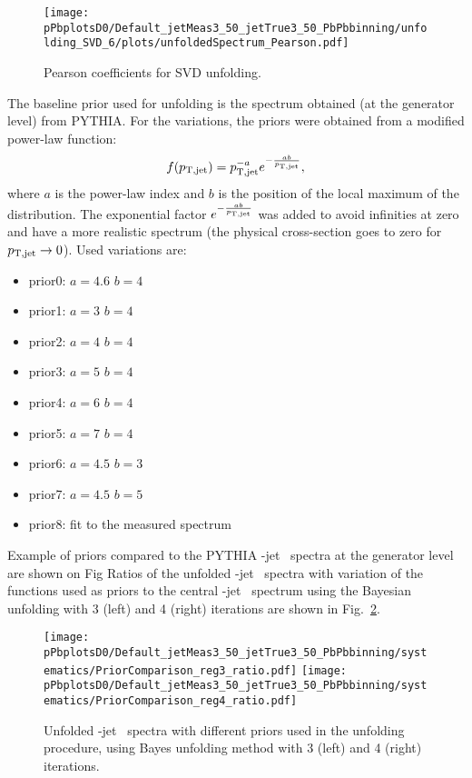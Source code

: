 \begin{figure}[bth]
\centering
\texttt{[image: pPbplotsD0/Default\_jetMeas3\_50\_jetTrue3\_50\_PbPbbinning/unfolding\_SVD\_6/plots/unfoldedSpectrum\_Pearson.pdf]}
\caption{Pearson coefficients for SVD unfolding.}
\label{fig:PbPb_unfPearson_pPb_Dzero_SVD}
\end{figure}


The baseline prior used for unfolding is the spectrum obtained (at the generator level) from PYTHIA.
For the variations, the priors were obtained from a modified power-law function:
\begin{equation}
f(p_{\mathrm{T,jet}}) = p_{\mathrm{T,jet}}^{-a}e^{-\frac{ab}{p_{\mathrm{T,jet}}}},
\end{equation}
where $a$ is the power-law index and $b$ is the position of the local maximum of the distribution. The exponential factor $e^{-\frac{ab}{p_{\mathrm{T,jet}}}}$ was added to avoid infinities at zero and have a more realistic spectrum (the physical cross-section goes to zero for $p_{\mathrm{T,jet}} \to 0$).
Used variations are: %
\begin{itemize}
\item prior0: $a=4.6$ $b=4$~\GeVc\ 
\item prior1: $a=3$ $b=4$~\GeVc\
\item prior2: $a=4$ $b=4$~\GeVc\
\item prior3: $a=5$ $b=4$~\GeVc\
\item prior4: $a=6$ $b=4$~\GeVc\
\item prior5: $a=7$ $b=4$~\GeVc\
\item prior6: $a=4.5$ $b=3$~\GeVc\
\item prior7: $a=4.5$ $b=5$~\GeVc\
\item prior8: fit to the measured spectrum
\end{itemize}

Example of priors compared to the PYTHIA \Dzero-jet \pt\ spectra at the generator level are shown on Fig
Ratios of the unfolded \Dzero-jet \pt\ spectra with variation of the functions used as priors to the central \Dzero-jet \pt\ spectrum using the Bayesian unfolding with 3 (left) and 4 (right) iterations are shown in Fig.~\ref{fig:PbPb_UnfSpec_pPb_Dzero_priors}. 


\begin{figure}[bth]
\centering
\texttt{[image: pPbplotsD0/Default\_jetMeas3\_50\_jetTrue3\_50\_PbPbbinning/systematics/PriorComparison\_reg3\_ratio.pdf]}
\texttt{[image: pPbplotsD0/Default\_jetMeas3\_50\_jetTrue3\_50\_PbPbbinning/systematics/PriorComparison\_reg4\_ratio.pdf]}
\caption{Unfolded \Dzero-jet \pt\ spectra with different priors used in the unfolding procedure, using Bayes unfolding method with 3 (left) and 4 (right) iterations.}
\label{fig:PbPb_UnfSpec_pPb_Dzero_priors}
\end{figure}


